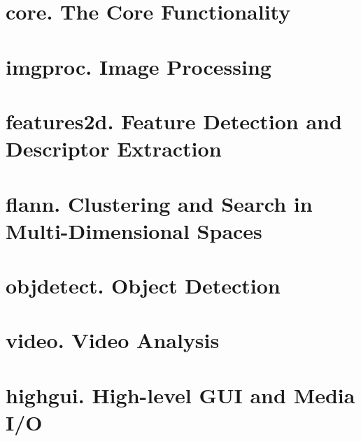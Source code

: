 

\chapter{core. The Core Functionality}
\renewcommand{\curModule}{core}









\chapter{imgproc. Image Processing}
\renewcommand{\curModule}{imgproc}










\chapter{features2d. Feature Detection and Descriptor Extraction}
\renewcommand{\curModule}{features2d}




\chapter{flann. Clustering and Search in Multi-Dimensional Spaces}
\renewcommand{\curModule}{flann}


\chapter{objdetect. Object Detection}
\renewcommand{\curModule}{objdetect}


\chapter{video. Video Analysis}
\renewcommand{\curModule}{video}


\chapter{highgui. High-level GUI and Media I/O}
\renewcommand{\curModule}{highgui}

\ifPy     %
\else

\fi

